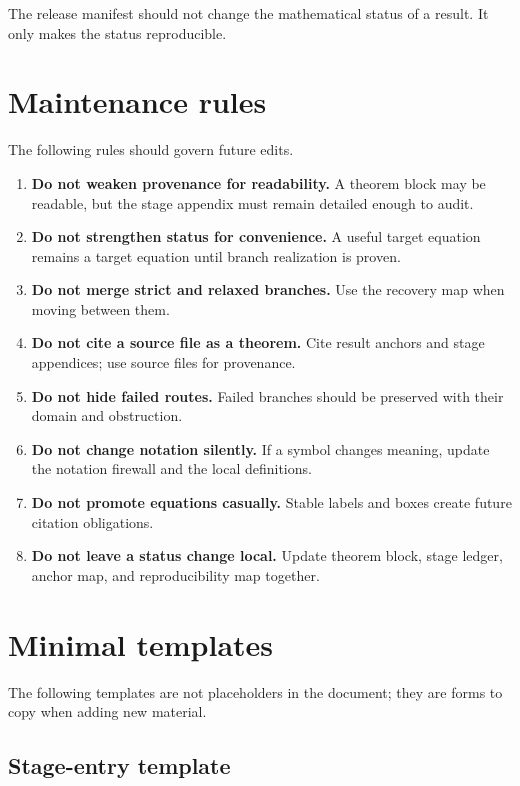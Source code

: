 The release manifest should not change the mathematical status of a result.  It only makes the status reproducible.

\section{Maintenance rules}
\label{sec:fill-maintenance-rules}

The following rules should govern future edits.

\begin{enumerate}[leftmargin=2.4em]
\item \textbf{Do not weaken provenance for readability.}  A theorem block may be readable, but the stage appendix must remain detailed enough to audit.
\item \textbf{Do not strengthen status for convenience.}  A useful target equation remains a target equation until branch realization is proven.
\item \textbf{Do not merge strict and relaxed branches.}  Use the recovery map when moving between them.
\item \textbf{Do not cite a source file as a theorem.}  Cite result anchors and stage appendices; use source files for provenance.
\item \textbf{Do not hide failed routes.}  Failed branches should be preserved with their domain and obstruction.
\item \textbf{Do not change notation silently.}  If a symbol changes meaning, update the notation firewall and the local definitions.
\item \textbf{Do not promote equations casually.}  Stable labels and boxes create future citation obligations.
\item \textbf{Do not leave a status change local.}  Update theorem block, stage ledger, anchor map, and reproducibility map together.
\end{enumerate}

\section{Minimal templates}
\label{sec:fill-minimal-templates}

The following templates are not placeholders in the document; they are forms to copy when adding new material.

\subsection{Stage-entry template}
\label{subsec:fill-stage-entry-template}

